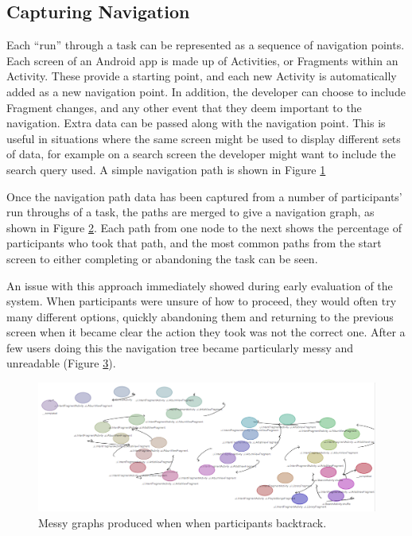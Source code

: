 \subsection{Capturing Navigation}

Each ``run'' through a task can be represented as a sequence of navigation points. Each screen of
an Android app is made up of Activities, or Fragments within an Activity. These provide a starting
point, and each new Activity is automatically added as a new navigation point. In addition, 
the developer can choose to include Fragment changes, and any other event that they deem important to 
the navigation. Extra data can be passed along with the navigation point. This is useful in situations
where the same screen might be used to display different sets of data, for example on a search screen the
developer might want to include the search query used. A simple navigation path is shown in Figure \ref{fig:task-navigation}

\begin{figure}
 \centering
 \label{fig:task-navigation}
\end{figure}

Once the navigation path data has been captured from a number of participants' run throughs of a
task, the paths are merged to give a navigation graph, as shown in Figure \ref{fig:task-navigation-tree}. Each path from one node to the next shows the percentage of participants who took that path, and the most
common paths from the start screen to either completing or abandoning the task can be seen.

\begin{figure}
 \centering
 \label{fig:task-navigation-tree}
\end{figure}

An issue with this approach immediately showed during early evaluation of the system. When participants were unsure of how to proceed, they would often try many different options, quickly abandoning them and returning to the previous screen when it became clear the action they took was not the correct one.
After a few users doing this the navigation tree became particularly messy and unreadable 
(Figure \ref{fig:task-navigation-mess}).

\begin{figure}
 \centering
 \includegraphics[width=\textwidth]{images/messy-graph}
 \caption{Messy graphs produced when when participants backtrack.}
 \label{fig:task-navigation-mess}
\end{figure}

